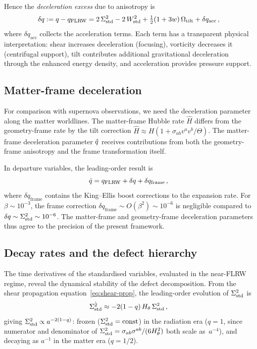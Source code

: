 Hence the \emph{deceleration excess} due to anisotropy is
\begin{equation}\label{eq:delta-q}
\delta q := q - q_{\mathrm{FLRW}}
= 2\,\Sigma^2_{\mathrm{std}}
  - 2\,W^2_{\mathrm{std}}
  + \tfrac{1}{2}(1+3w)\,\Omega_{\mathrm{tilt}}
  + \delta q_{\mathrm{acc}}\,,
\end{equation}
where $\delta q_{\mathrm{acc}}$ collects the acceleration
terms.  Each term has a transparent physical interpretation:
shear increases deceleration (focusing), vorticity decreases
it (centrifugal support), tilt contributes additional
gravitational deceleration through the enhanced energy
density, and acceleration provides pressure support.


\subsection{Matter-frame deceleration}\label{sec:matter-decel}

For comparison with supernova observations, we need the
deceleration parameter along the matter worldlines.  The
matter-frame Hubble rate $\hat{H}$ differs from the
geometry-frame rate by the tilt correction
$\hat{H} \approx H(1 + \sigma_{ab}v^a v^b/\Theta)$.
The matter-frame deceleration parameter $\hat{q}$ receives
contributions from both the geometry-frame anisotropy and
the frame transformation itself.

In departure variables, the leading-order result is
\begin{equation}\label{eq:qhat}
\hat{q} = q_{\mathrm{FLRW}} + \delta q
  + \delta q_{\mathrm{frame}}\,,
\end{equation}
where $\delta q_{\mathrm{frame}}$ contains the
King--Ellis boost corrections to the expansion rate.  For
$\beta \sim 10^{-3}$, the frame correction
$\delta q_{\mathrm{frame}} \sim O(\beta^2) \sim 10^{-6}$
is negligible compared to $\delta q \sim \Sigma^2_{\mathrm{std}} \sim 10^{-6}$.
The matter-frame and geometry-frame deceleration parameters
thus agree to the precision of the present framework.


\subsection{Decay rates and the defect hierarchy}
\label{sec:decay-rates}

The time derivatives of the standardised variables, evaluated
in the near-FLRW regime, reveal the dynamical stability of the
defect decomposition.  From the shear propagation
equation~\eqref{eq:shear-prop}, the leading-order evolution
of $\Sigma^2_{\mathrm{std}}$ is
\begin{equation}\label{eq:Sigstd-dot}
\dot{\Sigma^2_{\mathrm{std}}} \approx -2(1 - q)\,H_\theta\,\Sigma^2_{\mathrm{std}}\,,
\end{equation}
giving $\Sigma^2_{\mathrm{std}} \propto a^{-2(1-q)}$: frozen
($\Sigma^2_{\mathrm{std}} = \mathrm{const}$) in the radiation era ($q = 1$,
since numerator and denominator of
$\Sigma^2_{\mathrm{std}} = \sigma_{ab}\sigma^{ab}/(6H_\theta^2)$ both scale
as~$a^{-4}$), and decaying as $a^{-1}$ in the matter era
($q = 1/2$).

